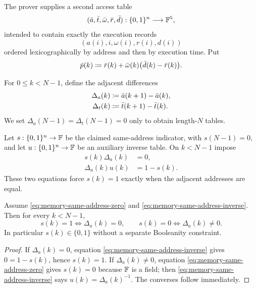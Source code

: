 The prover supplies a second access table
\begin{equation}
  (\bar a,\bar t,\bar\omega,\bar r,\bar d):\{0,1\}^n\longrightarrow\mathbb{F}^5,
  \label{eq:memory-sorted-trace}
\end{equation}
intended to contain exactly the execution records
\begin{equation}
  (a(i),i,\omega(i),r(i),d(i))
  \label{eq:memory-execution-record}
\end{equation}
ordered lexicographically by address and then by execution time.  Put
\begin{equation}
  \bar p(k)
  \coloneqq
  \bar r(k)+\bar\omega(k)\bigl(\bar d(k)-\bar r(k)\bigr).
  \label{eq:memory-sorted-post}
\end{equation}

For $0\le k<N-1$, define the adjacent differences
\begin{align}
  \Delta_a(k)&\coloneqq \bar a(k+1)-\bar a(k),
  \label{eq:memory-address-difference}\\
  \Delta_t(k)&\coloneqq \bar t(k+1)-\bar t(k).
  \label{eq:memory-time-difference}
\end{align}
We set $\Delta_a(N-1)=\Delta_t(N-1)=0$ only to obtain length-$N$ tables.

Let $s:\{0,1\}^n\to\mathbb{F}$ be the claimed same-address indicator, with $s(N-1)=0$, and let $u:\{0,1\}^n\to\mathbb{F}$ be an auxiliary inverse table.  On $k<N-1$ impose
\begin{align}
  s(k)\Delta_a(k)&=0,
  \label{eq:memory-same-address-zero}\\
  \Delta_a(k)u(k)&=1-s(k).
  \label{eq:memory-same-address-inverse}
\end{align}
These two equations force $s(k)=1$ exactly when the adjacent addresses are equal.

\begin{lemma}
\label{lem:memory-same-address-indicator}
Assume \eqref{eq:memory-same-address-zero} and \eqref{eq:memory-same-address-inverse}.  Then for every $k<N-1$,
\[
  s(k)=1 \iff \Delta_a(k)=0,
  \qquad
  s(k)=0 \iff \Delta_a(k)\ne0.
\]
In particular $s(k)\in\{0,1\}$ without a separate Booleanity constraint.
\end{lemma}

\begin{proof}
If $\Delta_a(k)=0$, equation \eqref{eq:memory-same-address-inverse} gives $0=1-s(k)$, hence $s(k)=1$.  If $\Delta_a(k)\ne0$, equation \eqref{eq:memory-same-address-zero} gives $s(k)=0$ because $\mathbb{F}$ is a field; then \eqref{eq:memory-same-address-inverse} says $u(k)=\Delta_a(k)^{-1}$.  The converses follow immediately.
\end{proof}

